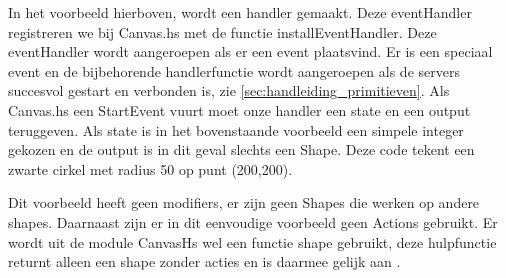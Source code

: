 

In het voorbeeld hierboven, wordt een handler gemaakt. Deze eventHandler registreren we bij Canvas.hs met de functie installEventHandler. Deze eventHandler wordt aangeroepen als er een event plaatsvind. Er is een speciaal  event en de bijbehorende handlerfunctie wordt aangeroepen als de servers succesvol gestart en verbonden is, zie \autoref{sec:handleiding_primitieven}. Als Canvas.hs een StartEvent vuurt moet onze handler een state en een output teruggeven. Als state is in het bovenstaande voorbeeld een simpele integer gekozen en de output is in dit geval slechts een Shape. Deze code tekent een zwarte cirkel met radius 50 op punt (200,200).

Dit voorbeeld heeft geen modifiers, er zijn geen Shapes die werken op andere shapes. Daarnaast zijn er in dit eenvoudige voorbeeld geen Actions gebruikt. Er wordt uit de module CanvasHs wel een functie shape gebruikt, deze hulpfunctie returnt alleen een shape zonder acties en is daarmee gelijk aan .
